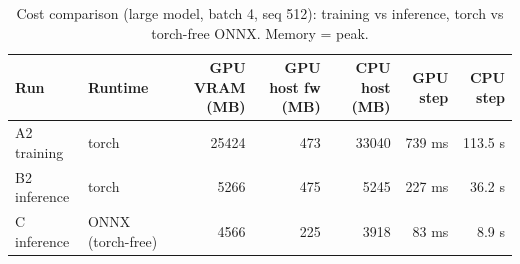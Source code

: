 \begin{table}[t]\centering
\caption{Cost comparison (large model, batch 4, seq 512): training vs inference, torch vs torch-free ONNX. Memory = peak.}
\begin{tabular}{llrrrrr}
\hline
Run & Runtime & GPU VRAM (MB) & GPU host fw (MB) & CPU host (MB) & GPU step & CPU step \\
\hline
A2 training & torch & 25424 & 473 & 33040 & 739 ms & 113.5 s \\
B2 inference & torch & 5266 & 475 & 5245 & 227 ms & 36.2 s \\
C inference & ONNX (torch-free) & 4566 & 225 & 3918 & 83 ms & 8.9 s \\
\hline
\end{tabular}
\end{table}
